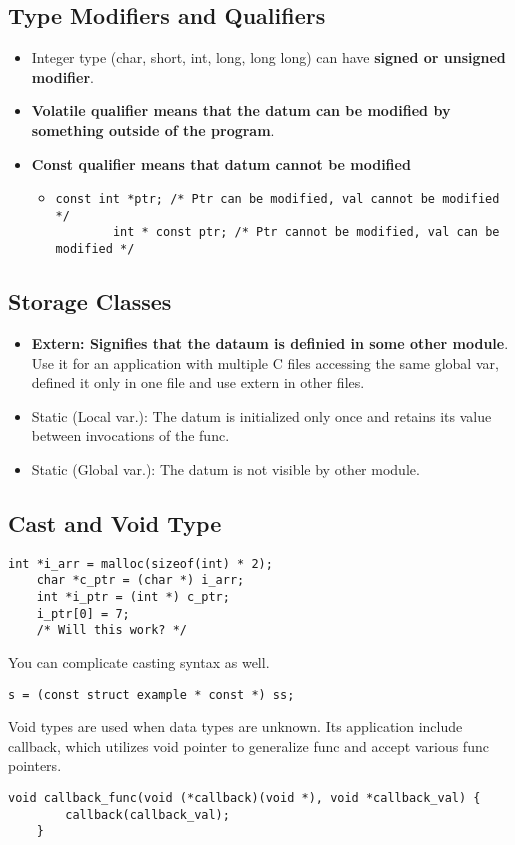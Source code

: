\documentclass{article}
\begin{document}
\subsection{Type Modifiers and Qualifiers}
\begin{itemize}
    \item Integer type (char, short, int, long, long long) can have \textbf{signed or unsigned modifier}.
    \item \textbf{Volatile qualifier means that the datum can be modified by something outside of the program}.
    \item \textbf{Const qualifier means that datum cannot be modified}
    \begin{itemize}
        \item \begin{lstlisting}[style=CStyle]
        const int *ptr; /* Ptr can be modified, val cannot be modified */
        int * const ptr; /* Ptr cannot be modified, val can be modified */
        \end{lstlisting}
    \end{itemize}
\end{itemize}

\subsection{Storage Classes}
\begin{itemize}
    \item \textbf{Extern: Signifies that the dataum is definied in some other module}. 
    Use it for an application with multiple C files accessing the same global var, defined it only in one file and use extern in other files.
    \item Static (Local var.): The datum is initialized only once and retains its value between invocations of the func.
    \item Static (Global var.): The datum is not visible by other module.
\end{itemize}

\subsection{Cast and Void Type}
\begin{lstlisting}[style=CStyle]
    int *i_arr = malloc(sizeof(int) * 2);
    char *c_ptr = (char *) i_arr;
    int *i_ptr = (int *) c_ptr;
    i_ptr[0] = 7;
    /* Will this work? */
\end{lstlisting}
You can complicate casting syntax as well.
\begin{lstlisting}[style=CStyle]
    s = (const struct example * const *) ss;
\end{lstlisting}
Void types are used when data types are unknown. 
Its application include callback, which utilizes void pointer to generalize func and accept various func pointers.
\begin{lstlisting}[style=CStyle]
    void callback_func(void (*callback)(void *), void *callback_val) {
        callback(callback_val);
    }
\end{lstlisting}
\end{document}
